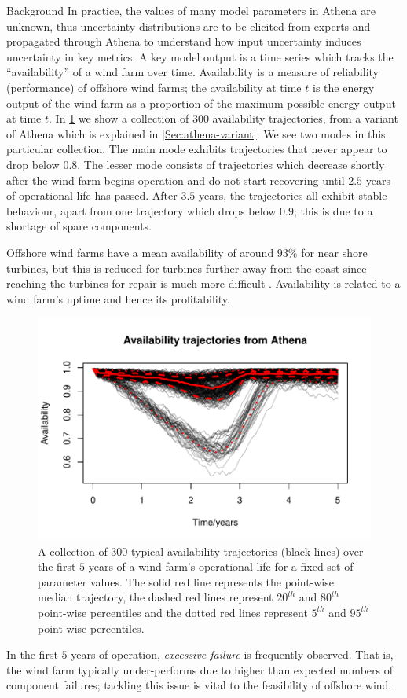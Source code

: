 \begin{chapter}{Background \label{Ch:background}}
In practice, the values of many model parameters in Athena are unknown, thus uncertainty distributions are to be elicited from experts and propagated through Athena to understand how input uncertainty induces uncertainty in key metrics.
A key model output is a time series which tracks the ``availability'' of a wind farm over time. Availability is a measure of reliability (performance) of offshore wind farms; the availability at time $t$ is the energy output of the wind farm as a proportion of the maximum possible energy output at time $t$. In \cref{Fig:availability-trajectories} we show a collection of $300$ availability trajectories, from a variant of Athena which is explained in \cref{Sec:athena-variant}. We see two modes in this particular collection. The main mode exhibits trajectories that never appear to drop below $0.8$. The lesser mode consists of trajectories which decrease shortly after the wind farm begins operation and do not start recovering until $2.5$ years of operational life has passed. After $3.5$ years, the trajectories all exhibit stable behaviour, apart from one trajectory which drops below $0.9$; this is due to a shortage of spare components.

Offshore wind farms have a mean availability of around $93\%$ for near shore turbines, but this is reduced for turbines further away from the coast since reaching the turbines for repair is much more difficult \citep{Carroll2016}. Availability is related to a wind farm's uptime and hence its profitability.
\begin{figure}[ht]
	\centering
	\includegraphics{fig-background/trajectories.pdf}
	\caption{A collection of $300$ typical availability trajectories (black lines) over the first $5$ years of a wind farm's operational life for a fixed set of parameter values. The solid red line represents the point-wise median trajectory, the dashed red lines represent $20^{th}$ and $80^{th}$  point-wise percentiles and the dotted red lines represent $5^{th}$ and $95^{th}$ point-wise percentiles.}
	\label{Fig:availability-trajectories}
\end{figure}
 In the first $5$ years of operation, \textit{excessive failure} is frequently observed. That is, the wind farm typically under-performs due to higher than expected numbers of component failures; tackling this issue is vital to the feasibility of offshore wind.


\end{chapter}
